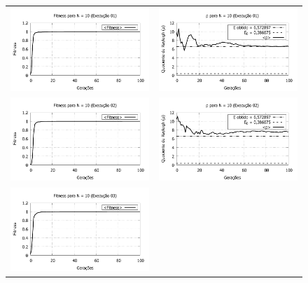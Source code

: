 \begin{figure}[htbp]
\centering
  \begin{tabular}{@{}cc@{}}
    \includegraphics[width=.45\textwidth]{figs/resultados/fitnessGrad/N10_01_fitness.pdf} &
    \includegraphics[width=.45\textwidth]{figs/resultados/fitnessGrad/N10_01_rho.pdf}   \\
		\includegraphics[width=.45\textwidth]{figs/resultados/fitnessGrad/N10_02_fitness.pdf} &
    \includegraphics[width=.45\textwidth]{figs/resultados/fitnessGrad/N10_02_rho.pdf}   \\
		\includegraphics[width=.45\textwidth]{figs/resultados/fitnessGrad/N10_03_fitness.pdf} &

\end{tabular}
\end{figure}
